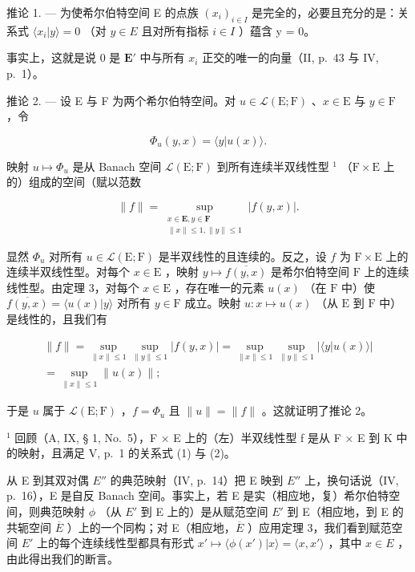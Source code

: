 推论 1. --- 为使希尔伯特空间 E 的点族 \((x_{i})_{i\in I}\) 是完全的，必要且充分的是：关系式 \(\langle x_{i}|y\rangle = 0\) （对 \(y \in E\) 且对所有指标 \(i \in I\) ）蕴含 y = 0。

事实上，这就是说 0 是 \(\mathbf{E}'\) 中与所有 \(x_{i}\) 正交的唯一的向量（II, p.~43 与 IV, p.~1）。

推论 2. --- 设 E 与 F 为两个希尔伯特空间。对 \(u \in \mathcal{L}(\mathrm{E};\mathrm{F})\) 、\(x \in \mathrm{E}\) 与 \(y \in \mathrm{F}\) ，令

\[
\Phi_ {u} (y, x) = \langle y | u (x) \rangle .\tag{18}
\]

映射 \(u \mapsto \Phi_u\) 是从 Banach 空间 \(\mathcal{L}(\mathrm{E};\mathrm{F})\) 到所有连续半双线性型 \(^1\) （\(\mathrm{F} \times \mathrm{E}\) 上的）组成的空间（赋以范数

\[
\| f\| = \sup_{\substack{x\in \mathbf{E},  y\in \mathbf{F}\\ \| x\| \leqslant 1, \| y\| \leqslant 1}}\left|f(y,x)\right|.\tag{19}
\]

显然 \(\Phi_u\) 对所有 \(u \in \mathcal{L}(\mathrm{E};\mathrm{F})\) 是半双线性的且连续的。反之，设 \(f\) 为 \(\mathrm{F} \times \mathrm{E}\) 上的连续半双线性型。对每个 \(x \in \mathrm{E}\) ，映射 \(y \mapsto \overline{f(y,x)}\) 是希尔伯特空间 \(\mathrm{F}\) 上的连续线性型。由定理 3，对每个 \(x \in \mathrm{E}\) ，存在唯一的元素 \(u(x)\) （在 \(\mathrm{F}\) 中）使 \(\overline{f(y,x)} = \langle u(x)|y\rangle\) 对所有 \(y \in \mathrm{F}\) 成立。映射 \(u: x \mapsto u(x)\) （从 \(\mathrm{E}\) 到 \(\mathrm{F}\) 中）是线性的，且我们有

\[
\begin{array}{l} \| f \| = \sup _ {\| x \| \leqslant 1} \sup _ {\| y \| \leqslant 1} | f (y, x) | = \sup _ {\| x \| \leqslant 1} \sup _ {\| y \| \leqslant 1} | \langle y | u (x) \rangle | \\ = \sup _ {\| x \| \leqslant 1} \| u (x) \|; \end{array}
\]

于是 \(u\) 属于 \(\mathcal{L}(\mathrm{E};\mathrm{F})\) ，\(f = \Phi_u\) 且 \(\| u\| = \| f\|\) 。这就证明了推论 2。

\(^{1}\) 回顾（A, IX, § 1, No.~5），F × E 上的（左）半双线性型 f 是从 F × E 到 K 中的映射，且满足 V, p.~1 的关系式 (1) 与 (2)。

从 E 到其双对偶 \(E''\) 的典范映射（IV, p.~14）把 E 映到 \(E''\) 上，换句话说（IV, p.~16），E 是自反 Banach 空间。事实上，若 E 是实（相应地，复）希尔伯特空间，则典范映射 \(\phi\) （从 \(E'\) 到 E 上的）是从赋范空间 \(E'\) 到 E（相应地，到 E 的共轭空间 \(\overline{E}\) ）上的一个同构；对 E（相应地，\(\overline{E}\) ）应用定理 3，我们看到赋范空间 \(E'\) 上的每个连续线性型都具有形式 \(x' \mapsto \langle \phi(x') | x \rangle = \langle x, x' \rangle\) ，其中 \(x \in E\) ，由此得出我们的断言。

